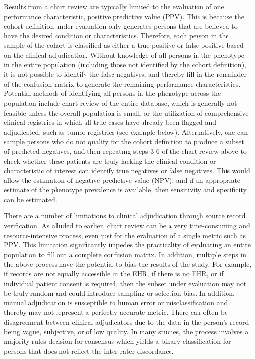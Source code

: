 \documentclass[
  letterpaper,
  paper=7in:10in,
  pagesize=pdftex,
  headinclude=on,
  footinclude=on,
  12pt]{scrbook}
\begin{document}
Results from a chart review are typically limited to the evaluation of
one performance characteristic, positive predictive value (PPV). This is
because the cohort definition under evaluation only generates persons
that are believed to have the desired condition or characteristics.
Therefore, each person in the sample of the cohort is classified as
either a true positive or false positive based on the clinical
adjudication. Without knowledge of all persons in the phenotype in the
entire population (including those not identified by the cohort
definition), it is not possible to identify the false negatives, and
thereby fill in the remainder of the confusion matrix to generate the
remaining performance characteristics. Potential methods of identifying
all persons in the phenotype across the population include chart review
of the entire database, which is generally not feasible unless the
overall population is small, or the utilization of comprehensive
clinical registries in which all true cases have already been flagged
and adjudicated, such as tumor registries (see example below).
Alternatively, one can sample persons who do not qualify for the cohort
definition to produce a subset of predicted negatives, and then
repeating steps 3-6 of the chart review above to check whether these
patients are truly lacking the clinical condition or characteristic of
interest can identify true negatives or false negatives. This would
allow the estimation of negative predictive value (NPV), and if an
appropriate estimate of the phenotype prevalence is available, then
sensitivity and specificity can be estimated.

There are a number of limitations to clinical adjudication through
source record verification. As alluded to earlier, chart review can be a
very time-consuming and resource-intensive process, even just for the
evaluation of a single metric such as PPV. This limitation significantly
impedes the practicality of evaluating an entire population to fill out
a complete confusion matrix. In addition, multiple steps in the above
process have the potential to bias the results of the study. For
example, if records are not equally accessible in the EHR, if there is
no EHR, or if individual patient consent is required, then the subset
under evaluation may not be truly random and could introduce sampling or
selection bias. In addition, manual adjudication is susceptible to human
error or misclassification and thereby may not represent a perfectly
accurate metric. There can often be disagreement between clinical
adjudicators due to the data in the person's record being vague,
subjective, or of low quality. In many studies, the process involves a
majority-rules decision for consensus which yields a binary
classification for persons that does not reflect the inter-rater
discordance.
\end{document}
